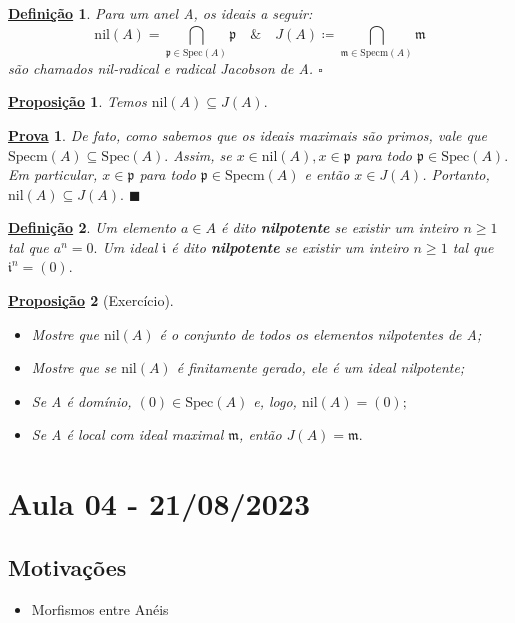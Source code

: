 \documentclass{article}
\newtheorem*{def*}{\underline{Defini\c c\~ao}}
\newtheorem*{prop*}{\underline{Proposi\c c\~ao}}
\newtheorem*{proof*}{\underline{Prova}}
\renewcommand\qedsymbol{$\blacksquare$}
\begin{document}
\begin{def*}
  Para um anel A, os ideais a seguir:
  \[
    \mathrm{nil}(A) = \bigcap_{\mathfrak{p}\in \mathrm{Spec}(A)}^{}{\mathfrak{p}}\quad \& \quad J(A)\coloneqq \bigcap_{\mathfrak{m}\in \mathrm{Specm}(A)}^{}{\mathfrak{m}}
  \]
  são chamados nil-radical e radical Jacobson de A. \(\square\)
\end{def*}
\begin{prop*}
  Temos \(\mathrm{nil}(A) \subseteq{J(A)}.\)
\end{prop*}
\begin{proof*}
  De fato, como sabemos que os ideais maximais são primos, vale que \(\mathrm{Specm}(A)\subseteq{\mathrm{Spec}(A)}.\) Assim, se
  \(x\in \mathrm{nil}(A),x\in \mathfrak{p}\) para todo \(\mathfrak{p}\in \mathrm{Spec}(A).\) Em particular, \(x\in \mathfrak{p}\) para todo \(\mathfrak{p}\in \mathrm{Specm}(A)\)
  e então \(x\in J(A)\). Portanto, \(\mathrm{nil}(A) \subseteq{J(A)}.\) \qedsymbol
\end{proof*}
\begin{def*}
  Um elemento \(a\in A\) é dito \textbf{nilpotente} se existir um inteiro \(n\geq 1\) tal que \(a^{n} = 0.\) Um ideal
  \(\mathfrak{i}\) é dito \textbf{nilpotente} se existir um inteiro \(n\geq 1\) tal que \(\mathfrak{i}^{n} = (0).\)
\end{def*}
\begin{prop*}[Exercício]
  \begin{itemize}
    \item[1)] Mostre que \(\mathrm{nil}(A)\) é o conjunto de todos os elementos nilpotentes de A;
    \item[2)] Mostre que se \(\mathrm{nil}(A)\) é finitamente gerado, ele é um ideal nilpotente;
    \item[3)] Se A é domínio, \((0)\in \mathrm{Spec}(A)\) e, logo, \(\mathrm{nil}(A) = (0);\)
    \item[4)] Se A é local com ideal maximal \(\mathfrak{m}\), então \(J(A) = \mathfrak{m}.\)
  \end{itemize}  
\end{prop*}
\newpage

\section{Aula 04 - 21/08/2023}
\subsection{Motivações}
\begin{itemize}
  \item Morfismos entre Anéis
\end{itemize}
\end{document}
